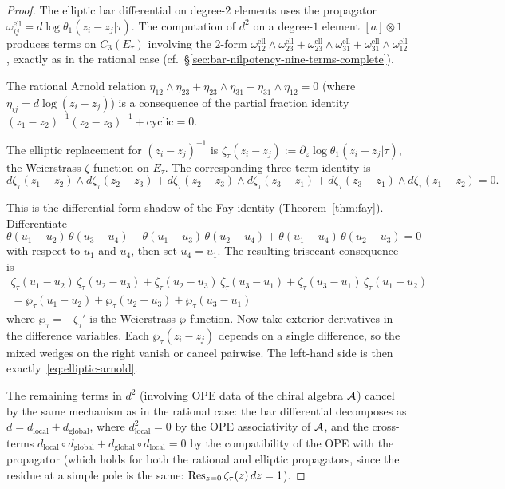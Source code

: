 \begin{proof}
The elliptic bar differential on degree-$2$ elements uses the
propagator $\omega_{ij}^{\mathrm{ell}} = d\log\theta_1(z_i - z_j
| \tau)$.  The computation of $d^2$ on a degree-$1$ element
$[a] \otimes 1$ produces terms on $\overline{C}_3(E_\tau)$ involving
the $2$-form $\omega_{12}^{\mathrm{ell}} \wedge \omega_{23}^{\mathrm{ell}}
+ \omega_{23}^{\mathrm{ell}} \wedge \omega_{31}^{\mathrm{ell}}
+ \omega_{31}^{\mathrm{ell}} \wedge \omega_{12}^{\mathrm{ell}}$,
exactly as in the rational case (cf.\
\S\ref{sec:bar-nilpotency-nine-terms-complete}).

The rational Arnold relation $\eta_{12} \wedge \eta_{23}
+ \eta_{23} \wedge \eta_{31} + \eta_{31} \wedge \eta_{12} = 0$
(where $\eta_{ij} = d\log(z_i - z_j)$) is a consequence of
the partial fraction identity
$(z_1 - z_2)^{-1}(z_2 - z_3)^{-1} + \text{cyclic} = 0$.

The elliptic replacement for $(z_i-z_j)^{-1}$ is
$\zeta_\tau(z_i - z_j) := \partial_z \log\theta_1(z_i - z_j|\tau)$,
the Weierstrass $\zeta$-function on $E_\tau$.  The corresponding
three-term identity is
\begin{equation}\label{eq:elliptic-arnold}
d\zeta_\tau(z_1{-}z_2) \wedge d\zeta_\tau(z_2{-}z_3)
+ d\zeta_\tau(z_2{-}z_3) \wedge d\zeta_\tau(z_3{-}z_1)
+ d\zeta_\tau(z_3{-}z_1) \wedge d\zeta_\tau(z_1{-}z_2) = 0.
\end{equation}

This is the differential-form shadow of the Fay identity
(Theorem~\ref{thm:fay}).  Differentiate
\[
\theta(u_1{-}u_2)\,\theta(u_3{-}u_4) -
\theta(u_1{-}u_3)\,\theta(u_2{-}u_4) +
\theta(u_1{-}u_4)\,\theta(u_2{-}u_3) = 0
\]
with respect to $u_1$ and $u_4$, then set $u_4 = u_1$.  The resulting
trisecant consequence is
\begin{multline*}
\zeta_\tau(u_1{-}u_2)\,\zeta_\tau(u_2{-}u_3)
+ \zeta_\tau(u_2{-}u_3)\,\zeta_\tau(u_3{-}u_1)
+ \zeta_\tau(u_3{-}u_1)\,\zeta_\tau(u_1{-}u_2) \\
= \wp_\tau(u_1{-}u_2) + \wp_\tau(u_2{-}u_3) + \wp_\tau(u_3{-}u_1)
\end{multline*}
where $\wp_\tau = -\zeta_\tau'$ is the Weierstrass $\wp$-function.
Now take exterior derivatives in the difference variables.  Each
$\wp_\tau(z_i-z_j)$ depends on a single difference, so the mixed wedges
on the right vanish or cancel pairwise.  The left-hand side is then
exactly~\eqref{eq:elliptic-arnold}.

The remaining terms in $d^2$ (involving OPE data of the chiral
algebra $\mathcal{A}$) cancel by the same mechanism as in the rational case:
the bar differential decomposes as $d = d_{\mathrm{local}} +
d_{\mathrm{global}}$, where $d_{\mathrm{local}}^2 = 0$ by the OPE
associativity of $\mathcal{A}$, and the cross-terms $d_{\mathrm{local}} \circ
d_{\mathrm{global}} + d_{\mathrm{global}} \circ d_{\mathrm{local}} = 0$
by the compatibility of the OPE with the propagator (which holds for
both the rational and elliptic propagators, since the residue at a
simple pole is the same: $\operatorname{Res}_{z=0} \zeta_\tau(z)\,dz = 1$).
\end{proof}

